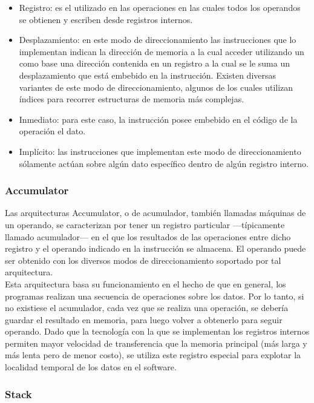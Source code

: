 \begin{itemize}
  \item Registro: es el utilizado en las operaciones en las cuales todos los 
operandos se obtienen y escriben desde registros internos.
  \item Desplazamiento: en este modo de direccionamiento las instrucciones que 
lo implementan indican la dirección de memoria a la cual acceder utilizando un 
como base una dirección contenida en un registro a la cual se le suma un 
desplazamiento que está embebido en la instrucción. Existen diversas variantes 
de este modo de direccionamiento, algunos de los cuales utilizan índices para 
recorrer estructuras de memoria más complejas.
  \item Inmediato: para este caso, la instrucción posee embebido en el código 
de la operación el dato.
  \item Implícito: las instrucciones que implementan este modo de 
direccionamiento sólamente actúan sobre algún dato específico dentro de algún 
registro interno.
\end{itemize}

\subsubsection{Accumulator}
\label{subsubsec:theory-modern-data_managment-accumulator}

Las arquitecturas Accumulator, o de acumulador, también llamadas máquinas de un 
operando, se caracterizan por tener un registro particular ---típicamente 
llamado acumulador--- en el que los resultados de las operaciones entre dicho 
registro y el operando indicado en la instrucción se almacena. El operando 
puede ser obtenido con los diversos modos de direccionamiento soportado por tal 
arquitectura.\\
Esta arquitectura basa su funcionamiento en el hecho de que en general, los 
programas realizan una secuencia de operaciones sobre los datos. Por lo tanto, 
si no existiese el acumulador, cada vez que se realiza una operación, se 
debería guardar el resultado en memoria, para luego volver a obtenerlo para 
seguir operando. Dado que la tecnología con la que se implementan los registros 
internos permiten mayor velocidad de transferencia que la memoria principal 
(más larga y más lenta pero de menor costo), se utiliza este registro especial 
para explotar la localidad temporal de los datos en el software.

\subsubsection{Stack}
\label{subsubsec:theory-modern-data_managment-stack}

